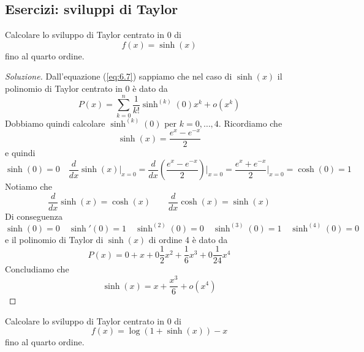 \subsection{Esercizi: sviluppi di Taylor}
\begin{exercise}
    \label{ex:6.4}
    Calcolare lo sviluppo di Taylor centrato in $0$ di 
    \[
    f(x) = \sinh(x)
    \]
    fino al quarto ordine.
\end{exercise}
\begin{proof}[Soluzione]
    Dall'equazione (\ref{eq:6.7}) sappiamo che nel caso di $\sinh(x)$ il polinomio di Taylor centrato in $0$ è dato da
    \[
    P(x) = \sum_{k=0}^n \frac{1}{k!} \sinh^{(k)}(0)x^k + o(x^k)
    \]
    Dobbiamo quindi calcolare $\sinh^{(k)}(0)$ per $k=0, \dots, 4$. Ricordiamo che 
    \[
    \sinh(x) = \frac{e^x-e^{-x}}{2}
    \]
    e quindi
    \[
    \sinh(0) = 0 \quad \frac{d}{dx}\sinh(x)\bigg|_{x=0} = \frac{d}{dx}\left(\frac{e^x-e^{-x}}{2}\right)\bigg|_{x=0} = \frac{e^x+e^{-x}}{2}\bigg|_{x=0} = \cosh(0) = 1
    \]
    Notiamo che
    \[
    \frac{d}{dx}\sinh(x) = \cosh(x) \qquad \frac{d}{dx}\cosh(x) = \sinh(x)
    \]
    Di conseguenza
    \[
    \sinh(0) = 0 \quad \sinh'(0) = 1 \quad \sinh^{(2)}(0) = 0 \quad \sinh^{(3)}(0) = 1 \quad \sinh^{(4)}(0) = 0
    \]
    e il polinomio di Taylor di $\sinh(x)$ di ordine 4 è dato da
    \[
    P(x) = 0+x+0\frac{1}{2}x^2 + \frac{1}{6}x^3 + 0\frac{1}{24}x^4
    \]
    Concludiamo che
    \[
    \sinh(x) = x+\frac{x^3}{6} + o(x^4)
    \]
\end{proof}
\begin{exercise}
    \label{ex:6.5}
    Calcolare lo sviluppo di Taylor centrato in $0$ di 
    \[
    f(x) = \log(1+\sinh(x))-x
    \]
    fino al quarto ordine.
\end{exercise}
